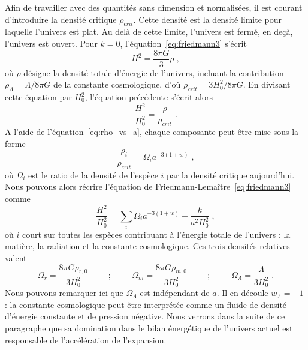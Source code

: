 \documentclass[11pt, twoside, a4paper, openright]{report}
\begin{document}
Afin de travailler avec des quantités sans dimension et normalisées, il est courant d'introduire la densité critique $\rho_{crit}$. Cette densité est la densité limite pour laquelle l'univers est plat. Au delà de cette limite, l'univers est fermé, en deçà, l'univers est ouvert. Pour $k = 0$, l'équation~\ref{eq:friedmann3} s'écrit
\begin{equation}
  H^{2} = \frac{8 \pi G }{3} \rho  \; ,
\end{equation}
où $\rho$ désigne la densité totale d'énergie de l'univers, incluant la contribution $\rho_{\Lambda} = \Lambda / 8 \pi G$ de la constante cosmologique, d'où $\rho_{crit} = 3 H_0^2 / 8 \pi G$. En divisant cette équation par $H_{0}^{2}$, l'équation précédente s'écrit alors
\begin{equation}
  \label{eq:friedmann5}
  \frac{H^2}{H_0^2} = \frac{\rho}{\rho_{crit}}  \; .
\end{equation}
A l'aide de l'équation~\ref{eq:rho_vs_a}, chaque composante peut être mise sous la forme
\begin{equation}
  \label{eq:def_omgega}
  \frac{\rho_i}{\rho_{crit}} = \Omega_i a^{-3 (1+w)}  \; , 
\end{equation}
où $\Omega_i$ est le ratio de la densité de l'espèce $i$ par la densité critique aujourd'hui. Nous pouvons alors récrire l'équation de Friedmann-Lemaître~\ref{eq:friedmann3} comme
\begin{equation}
  \label{eq:friedmann6}
  \frac{H^2}{H_0^2} = \sum\limits_i \Omega_i a^{-3 (1+w)} - \frac{k}{a^{2} H_{0}^{2}} \; ,
\end{equation}
où $i$ court sur toutes les espèces contribuant à l'énergie totale de l'univers : la matière, la radiation et la constante cosmologique. Ces trois densités relatives valent
\begin{equation}
  \label{eq:def_omega2}
\Omega_{r} = \frac{8 \pi G \rho_{r, 0}}{3 H_{0}^{2}} \hspace{1cm} ; \hspace{1cm} \Omega_{m} = \frac{8 \pi G \rho_{m, 0}}{3 H_{0}^{2}} \hspace{1cm} ;\hspace{1cm} \Omega_{\Lambda} = \frac{\Lambda}{3 H_{0}^{2}}  \; .
\end{equation}
Nous pouvons remarquer ici que $\Omega_{\Lambda}$ est indépendant de $a$. Il en découle $w_{\Lambda} = -1$ : la constante cosmologique peut être interprétée comme un fluide de densité d'énergie constante et de pression négative. Nous verrons dans la suite de ce paragraphe que sa domination dans le bilan énergétique de l'univers actuel est responsable de l'accélération de l'expansion.
\end{document}
